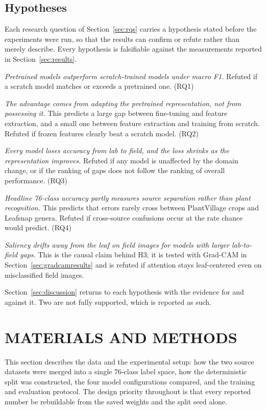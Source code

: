 \documentclass[12pt,a4paper]{article}
\begin{document}
\subsection{Hypotheses}
\label{sec:hypotheses}
Each research question of Section~\ref{sec:rqs} carries a hypothesis stated before the experiments were run, so that the results can confirm or refute rather than merely describe. Every hypothesis is falsifiable against the measurements reported in Section~\ref{sec:results}.

\begin{description}[leftmargin=1.6cm,style=nextline]
    \item[\textbf{H1}] \emph{Pretrained models outperform scratch-trained models under macro F1.} Refuted if a scratch model matches or exceeds a pretrained one. (RQ1)
    \item[\textbf{H2}] \emph{The advantage comes from adapting the pretrained representation, not from possessing it.} This predicts a large gap between fine-tuning and feature extraction, and a small one between feature extraction and training from scratch. Refuted if frozen features clearly beat a scratch model. (RQ2)
    \item[\textbf{H3}] \emph{Every model loses accuracy from lab to field, and the loss shrinks as the representation improves.} Refuted if any model is unaffected by the domain change, or if the ranking of gaps does not follow the ranking of overall performance. (RQ3)
    \item[\textbf{H4}] \emph{Headline 76-class accuracy partly measures source separation rather than plant recognition.} This predicts that errors rarely cross between PlantVillage crops and Leafsnap genera. Refuted if cross-source confusions occur at the rate chance would predict. (RQ4)
    \item[\textbf{H5}] \emph{Saliency drifts away from the leaf on field images for models with larger lab-to-field gaps.} This is the causal claim behind H3; it is tested with Grad-CAM in Section~\ref{sec:gradcamresults} and is refuted if attention stays leaf-centered even on misclassified field images.
\end{description}

Section~\ref{sec:discussion} returns to each hypothesis with the evidence for and against it. Two are not fully supported, which is reported as such.

\section{MATERIALS AND METHODS}
\label{sec:methods}
This section describes the data and the experimental setup: how the two source datasets were merged into a single 76-class label space, how the deterministic split was constructed, the four model configurations compared, and the training and evaluation protocol. The design priority throughout is that every reported number be rebuildable from the saved weights and the split seed alone.
\end{document}
